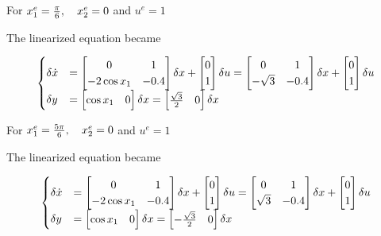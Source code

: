 \documentclass[12pt,a4paper]{article}
\begin{document}
For $x_1^e = {\pi\over6},\quad x_2^e = 0$ and $u^e = 1$

The linearized equation became

\[
\begin{cases}
	\delta \dot x &= \begin{bmatrix}
		0 & 1 \\ -2\cos x_1 & -0.4
	\end{bmatrix} \delta x + \begin{bmatrix}
	0 \\ 1
	\end{bmatrix} \delta u  = \begin{bmatrix}
	0 & 1 \\ -\sqrt3 & -0.4
	\end{bmatrix} \delta x + \begin{bmatrix}
	0 \\ 1 
	\end{bmatrix} \delta u \\
	\delta y &= \begin{bmatrix}
		\cos x_1 & 0
	\end{bmatrix}\delta x = \begin{bmatrix}
	{\sqrt3\over2} & 0 
	\end{bmatrix}\delta x
\end{cases}
\]

For $x_1^e = {5\pi\over6},\quad x_2^e = 0$ and $u^e = 1$

The linearized equation became

\[
\begin{cases}
	\delta \dot x &= \begin{bmatrix}
		0 & 1 \\ -2\cos x_1 & -0.4
	\end{bmatrix} \delta x + \begin{bmatrix}
		0 \\ 1
	\end{bmatrix} \delta u  = \begin{bmatrix}
		0 & 1 \\ \sqrt3 & -0.4
	\end{bmatrix} \delta x + \begin{bmatrix}
		0 \\ 1 
	\end{bmatrix} \delta u \\
	\delta y &= \begin{bmatrix}
		\cos x_1 & 0
	\end{bmatrix}\delta x = \begin{bmatrix}
		-{\sqrt3\over2} & 0 
	\end{bmatrix}\delta x
\end{cases}
\]
\end{document}
